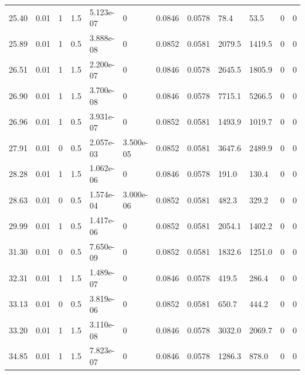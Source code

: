 \documentclass[preview]{standalone}
\begin{document}
{{\begin{tabular}{L{1.2cm}C{1.2cm} C{0.3cm}C{0.5cm} C{1.4cm}C{1.4cm} C{1.4cm}C{1.4cm} C{1.6cm}C{1.6cm} C{1.6cm}C{1.6cm}}
  25.40  &  0.01  & 1     & 1.5 &  5.123e-07  & 0  &  0.0846&   0.0578& 78.4 & 53.5   &  0 & 0  \\ 
  25.89  &  0.01  & 1     & 0.5 &  3.888e-08  & 0  &  0.0852&   0.0581& 2079.5 & 1419.5   &  0 & 0  \\ 
  26.51  &  0.01  & 1     & 1.5 &  2.200e-07  & 0  &  0.0846&   0.0578& 2645.5 & 1805.9   &  0 & 0  \\ 
  26.90  &  0.01  & 1     & 1.5 &  3.700e-08  & 0  &  0.0846&   0.0578& 7715.1 & 5266.5   &  0 & 0  \\ 
  26.96  &  0.01  & 1     & 0.5 &  3.931e-07  & 0  &  0.0852&   0.0581& 1493.9 & 1019.7   &  0 & 0  \\ 
  27.91  &  0.01  & 0     & 0.5 &  2.057e-03  & 3.500e-05  &  0.0852&   0.0581& 3647.6 & 2489.9   &  0 & 0  \\ 
  28.28  &  0.01  & 1     & 1.5 &  1.062e-06  & 0  &  0.0846&   0.0578& 191.0 & 130.4   &  0 & 0  \\ 
  28.63  &  0.01  & 0     & 0.5 &  1.574e-04  & 3.000e-06  &  0.0852&   0.0581& 482.3 & 329.2   &  0 & 0  \\ 
  29.99  &  0.01  & 1     & 0.5 &  1.417e-06  & 0  &  0.0852&   0.0581& 2054.1 & 1402.2   &  0 & 0  \\ 
  31.30  &  0.01  & 0     & 0.5 &  7.650e-09  & 0  &  0.0852&   0.0581& 1832.6 & 1251.0   &  0 & 0  \\ 
  32.31  &  0.01  & 1     & 1.5 &  1.489e-07  & 0  &  0.0846&   0.0578& 419.5 & 286.4   &  0 & 0  \\ 
  33.13  &  0.01  & 0     & 0.5 &  3.819e-06  & 0  &  0.0852&   0.0581& 650.7 & 444.2   &  0 & 0  \\ 
  33.20  &  0.01  & 1     & 1.5 &  3.110e-08  & 0  &  0.0846&   0.0578& 3032.0 & 2069.7   &  0 & 0  \\ 
  34.85  &  0.01  & 1     & 1.5 &  7.823e-07  & 0  &  0.0846&   0.0578& 1286.3 & 878.0   &  0 & 0  \\ 
\hline 
\end{tabular} 

}}
\end{document}
